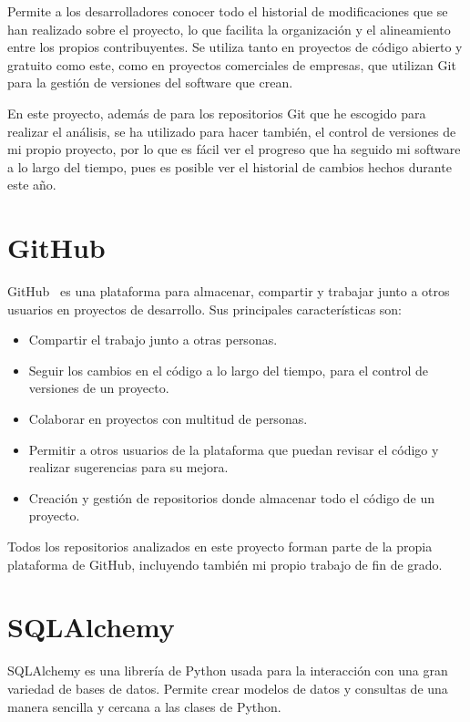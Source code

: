 \documentclass[a4paper, 12pt]{book}
\begin{document}
Permite a los desarrolladores conocer todo el historial de modificaciones que se han realizado sobre el proyecto, lo que facilita la organización y el alineamiento entre los propios contribuyentes. Se utiliza tanto en proyectos de código abierto y gratuito como este, como en proyectos comerciales de empresas, que utilizan Git para la gestión de versiones del software que crean.


En este proyecto, además de para los repositorios Git que he escogido para realizar el análisis, se ha utilizado para hacer también, el control de versiones de mi propio proyecto, por lo que es fácil ver el progreso que ha seguido mi software a lo largo del tiempo, pues es posible ver el historial de cambios hechos durante este año.

\section{GitHub}
\label{sec:GitHub}

GitHub~\cite{github:_github}  es una plataforma para almacenar, compartir y trabajar junto a otros usuarios en proyectos de desarrollo. Sus principales características son:

\begin{itemize}
  \item Compartir el trabajo junto a otras personas.
  \item Seguir los cambios en el código a lo largo del tiempo, para el control de versiones de un proyecto.
  \item Colaborar en proyectos con multitud de personas.
  \item Permitir a otros usuarios de la plataforma que puedan revisar el código y realizar sugerencias para su mejora.
  \item Creación y gestión de repositorios donde almacenar todo el código de un proyecto.
\end{itemize}

Todos los repositorios analizados en este proyecto forman parte de la propia plataforma de GitHub, incluyendo también mi propio trabajo de fin de grado.

\section{SQLAlchemy}
\label{sec:SQLAlchemy}

SQLAlchemy es una librería de Python usada para la interacción con una gran variedad de bases de datos. Permite crear modelos de datos y consultas de una manera sencilla y cercana a las clases de Python.
\end{document}
